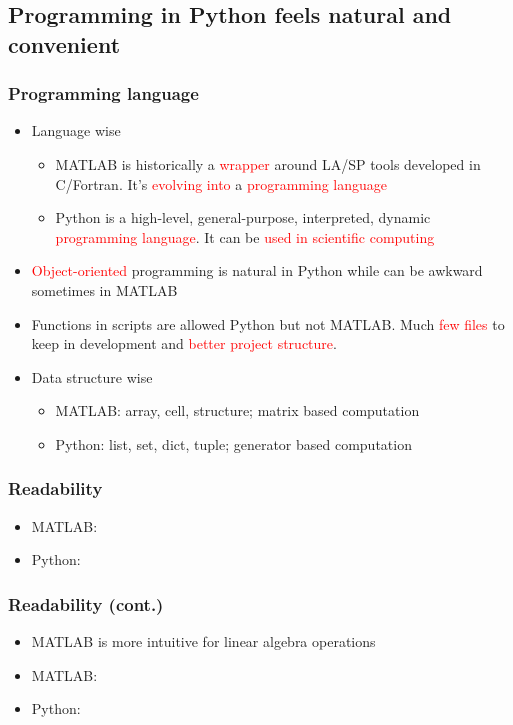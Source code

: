 \documentclass[compress]{beamer}
\begin{document}
\subsection{Programming in Python feels natural and convenient}
\begin{frame}
	\frametitle{Programming language}
	\begin{itemize}
		\item Language wise
		\begin{itemize}
			\item MATLAB is historically a \textcolor{red}{wrapper} around LA/SP tools developed in C/Fortran. It's \textcolor{red}{evolving into} a \textcolor{red}{programming language}
			\item Python is a high-level, general-purpose, interpreted, dynamic \textcolor{red}{programming language}. It can be \textcolor{red}{used in scientific computing}
		\end{itemize}
		\item \textcolor{red}{Object-oriented} programming is natural in Python while can be awkward sometimes in MATLAB
		\item Functions in scripts are allowed Python but not MATLAB. Much \textcolor{red}{few files} to keep in development and \textcolor{red}{better project structure}.
		\item Data structure wise
		\begin{itemize}
			\item MATLAB: array, cell, structure; matrix based computation
			\item Python: list, set, dict, tuple; generator based computation 
		\end{itemize}
	\end{itemize}
\end{frame}


\begin{frame}
	\frametitle{Readability}
	\begin{itemize}
		\item MATLAB:
		
		\item Python:
		
	\end{itemize}
\end{frame}

\begin{frame}
	\frametitle{Readability (cont.)}
	\begin{itemize}
		\item MATLAB is more intuitive for linear algebra operations
		\item MATLAB:
		
		\item Python:
		
	\end{itemize}
\end{frame}
\end{document}
